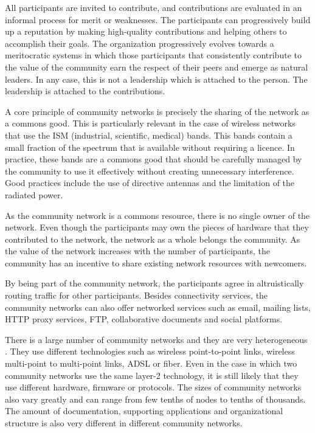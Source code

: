 \documentclass[journal]{IEEEtran}
\begin{document}
All participants are invited to contribute, and contributions are evaluated in an informal process for merit or weaknesses.
The participants can progressively build up a reputation by making high-quality contributions and helping others to accomplish their goals.
The organization progressively evolves towards a meritocratic systems in which those participants that consistently contribute to the value of the community earn the respect of their peers and emerge as natural leaders.
In any case, this is not a leadership which is attached to the person. 
The leadership is attached to the contributions.

A core principle of community networks is precisely the sharing of the network as a commons good.
This is particularly relevant in the case of wireless networks that use the ISM (industrial, scientific, medical) bands.
This bands contain a small fraction of the spectrum that is available without requiring a licence. 
In practice, these bands are a commons good that should be carefully managed by the community to use it effectively without creating unnecessary interference.
Good practices include the use of directive antennas and the limitation of the radiated power.

As the community network is a commons resource, there is no single owner of the network.
Even though the participants may own the pieces of hardware that they contributed to the network, the network as a whole belongs the community.
As the value of the network increases with the number of participants, the community has an incentive to share existing network resources with newcomers.

By being part of the community network, the participants agree in altruistically routing traffic for other participants.
Besides connectivity services, the community networks can also offer networked services such as email, mailing lists, HTTP proxy services, FTP, collaborative documents and social platforms.

There is a large number of community networks and they are very heterogeneous \cite{avonts2013qbe}.
They use different technologies such as wireless point-to-point links, wireless multi-point to multi-point links, ADSL or fiber.
Even in the case in which two community networks use the same layer-2 technology, it is still likely that they use different hardware, firmware or protocols.
The sizes of community networks also vary greatly and can range from few tenths of nodes to tenths of thousands.
The amount of documentation, supporting applications and organizational structure is also very different in different community networks.
\end{document}
